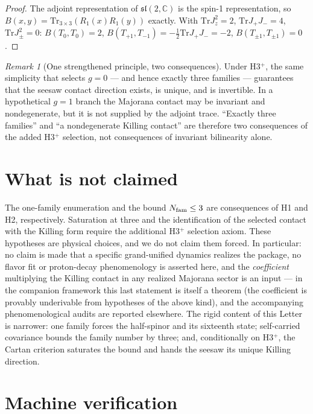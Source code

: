 \documentclass[
  aps,prd,superscriptaddress,nofootinbib,preprint
]{revtex4-2}
\theoremstyle{remark}
\newtheorem{remark}{Remark}
\newcommand{\Tr}{\mathrm{Tr}}
\newcommand{\sltwo}{\mathfrak{sl}(2,\mathbb C)}
\begin{document}
\begin{proof}
The adjoint representation of $\sltwo$ is the spin-1 representation,
so $B(x,y)=\Tr_{3\times3}(R_1(x)R_1(y))$ exactly.  With
$\Tr J_z^2=2$, $\Tr J_+J_-=4$, $\Tr J_\pm^2=0$:
$B(T_0,T_0)=2$, $B(T_{+1},T_{-1})=-\tfrac12\Tr J_+J_-=-2$,
$B(T_{\pm1},T_{\pm1})=0$.
\end{proof}

\begin{remark}[One strengthened principle, two consequences]
Under H3$^+$, the same simplicity that selects $g=0$ --- and hence exactly three
families --- guarantees that the seesaw contact direction exists, is
unique, and is invertible.  In a hypothetical $g=1$ branch the Majorana
contact may be invariant and nondegenerate, but it is not supplied by
the adjoint trace.  ``Exactly three families'' and ``a nondegenerate
Killing contact'' are therefore two consequences of the added H3$^+$
selection, not consequences of invariant bilinearity alone.
\end{remark}

\section{What is not claimed}
\label{sec:notclaimed}

The one-family enumeration and the bound $N_{\rm fam}\le3$ are
consequences of H1 and H2, respectively.  Saturation at three and the
identification of the selected contact with the Killing form require
the additional H3$^+$ selection axiom.  These hypotheses are physical
choices, and we do not claim them forced.  In
particular: no claim is made that a specific grand-unified dynamics
realizes the package, no flavor fit or proton-decay phenomenology is
asserted here, and the \emph{coefficient} multiplying the Killing
contact in any realized Majorana sector is an input --- in the
companion framework this last statement is itself a theorem (the
coefficient is provably underivable from hypotheses of the above
kind), and the accompanying phenomenological audits are reported
elsewhere.  The rigid content of this Letter is narrower: one family
forces the half-spinor and its sixteenth state; self-carried covariance
bounds the family number by three; and, conditionally on H3$^+$, the
Cartan criterion saturates the bound and hands the seesaw its unique
Killing direction.

\section{Machine verification}
\label{sec:verification}
\end{document}
